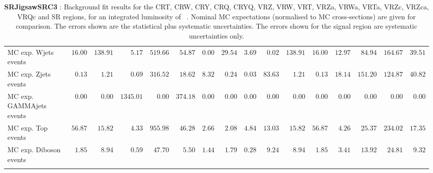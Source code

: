 \begin{table}
{\begin{tabular*}{\textwidth}{@{\extracolsep{\fill}}lrrrrrrrrrrrrrrr}
        MC exp. Wjets events         & $16.00$          & $138.91$          & $5.17$          & $519.66$          & $54.87$          & $0.00$          & $29.54$          & $3.69$          & $0.02$          & $138.91$          & $16.00$          & $12.97$          & $84.94$          & $164.67$          & $39.51$              \\
        MC exp. Zjets events         & $0.13$          & $1.21$          & $0.69$          & $316.52$          & $18.62$          & $8.32$          & $0.24$          & $0.03$          & $83.63$          & $1.21$          & $0.13$          & $18.14$          & $151.20$          & $124.87$          & $40.82$              \\
        MC exp. GAMMAjets events         & $0.00$          & $0.00$          & $1345.01$          & $0.00$          & $374.18$          & $0.00$          & $0.00$          & $0.00$          & $0.00$          & $0.00$          & $0.00$          & $0.00$          & $0.00$          & $0.00$          & $0.00$              \\
        MC exp. Top events         & $56.87$          & $15.82$          & $4.33$          & $955.98$          & $46.28$          & $2.66$          & $2.08$          & $4.84$          & $13.03$          & $15.82$          & $56.87$          & $4.26$          & $25.37$          & $234.02$          & $17.35$              \\
        MC exp. Diboson events         & $1.85$          & $8.94$          & $0.59$          & $47.70$          & $5.50$          & $1.44$          & $1.79$          & $0.28$          & $9.24$          & $8.94$          & $1.85$          & $3.41$          & $13.92$          & $24.81$          & $9.32$              \\
\noalign{\smallskip}\hline\noalign{\smallskip}
\end{tabular*}
}
\caption{{\bf SRJigsawSRC3} : Background fit results for the CRT, CRW, CRY, CRQ, CRYQ, VRZ, VRW, VRT, VRZa, VRWa, VRTa, VRZc, VRZca, VRQc and SR regions, for an integrated luminosity of \ourintlumi~\ifb. Nominal MC expectations (normalised to MC cross-sections) are given for comparison. The errors shown are the statistical plus systematic uncertainties. The errors shown for the signal region are systematic uncertainties only.}
\label{table.results.systematics.in.logL.fit.CRT.CRW.CRY.CRQ.CRYQ.VRZ.VRW.VRT.VRZa.VRWa.VRTa.VRZc.VRZca.VRQc.SR.SRJigsawSRC3}
\end{table}
%